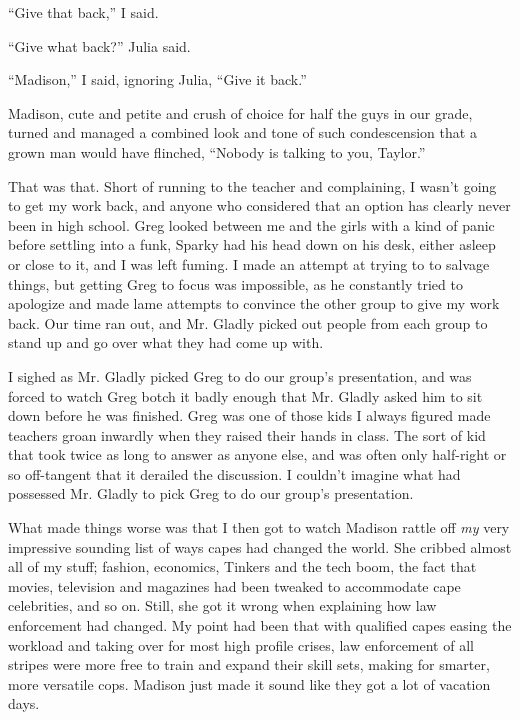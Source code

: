 ``Give that back,'' I said.



``Give what back?'' Julia said.



``Madison,'' I said, ignoring Julia, ``Give it back.''



Madison, cute and petite and crush of choice for half the guys in our grade, turned and managed a combined look and tone of such condescension that a grown man would have flinched, ``Nobody is talking to you, Taylor.''



That was that.  Short of running to the teacher and complaining, I wasn't going to get my work back, and anyone who considered that an option has clearly never been in high school.  Greg looked between me and the girls with a kind of panic before settling into a funk, Sparky had his head down on his desk, either asleep or close to it, and I was left fuming.  I made an attempt at trying to to salvage things, but getting Greg to focus was impossible, as he constantly tried to apologize and made lame attempts to convince the other group to give my work back.  Our time ran out, and Mr. Gladly picked out people from each group to stand up and go over what they had come up with.



I sighed as Mr. Gladly picked Greg to do our group's presentation, and was forced to watch Greg botch it badly enough that Mr. Gladly asked him to sit down before he was finished.  Greg was one of those kids I always figured made teachers groan inwardly when they raised their hands in class.  The sort of kid that took twice as long to answer as anyone else, and was often only half-right or so off-tangent that it derailed the discussion.  I couldn't imagine what had possessed Mr. Gladly to pick Greg to do our group's presentation.



What made things worse was that I then got to watch Madison rattle off \emph{my} very impressive sounding list of ways capes had changed the world.  She cribbed almost all of my stuff; fashion, economics, Tinkers and the tech boom, the fact that movies, television and magazines had been tweaked to accommodate cape celebrities, and so on.  Still, she got it wrong when explaining how law enforcement had changed.  My point had been that with qualified capes easing the workload and taking over for most high profile crises, law enforcement of all stripes were more free to train and expand their skill sets, making for smarter, more versatile cops.  Madison just made it sound like they got a lot of vacation days.



